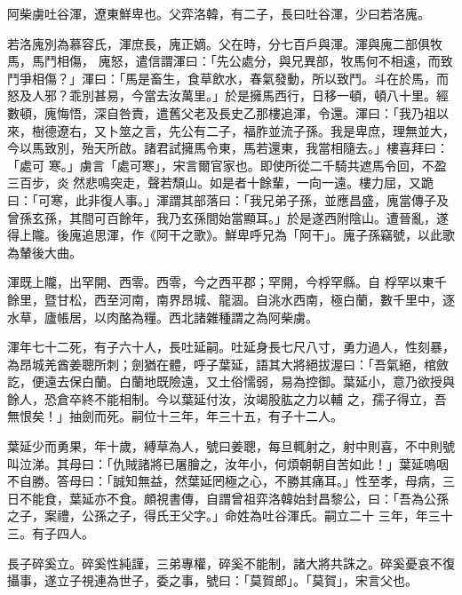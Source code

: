
\begin{pinyinscope}

 阿柴虜吐谷渾，遼東鮮卑也。父弈洛韓，有二子，長曰吐谷渾，少曰若洛廆。



 若洛廆別為慕容氏，渾庶長，廆正嫡。父在時，分七百戶與渾。渾與廆二部俱牧馬，馬鬥相傷，
 廆怒，遣信謂渾曰：「先公處分，與兄異部，牧馬何不相遠，而致鬥爭相傷？」渾曰：「馬是畜生，食草飲水，春氣發動，所以致鬥。斗在於馬，而怒及人邪？乖別甚易，今當去汝萬里。」於是擁馬西行，日移一頓，頓八十里。經數頓，廆悔悟，深自咎責，遣舊父老及長史乙那樓追渾，令還。渾曰：「我乃祖以來，樹德遼右，又卜筮之言，先公有二子，福胙並流子孫。我是卑庶，理無並大，今以馬致別，殆天所啟。諸君試擁馬令東，馬若還東，我當相隨去。」樓喜拜曰：「處可
 寒。」虜言「處可寒」，宋言爾官家也。即使所從二千騎共遮馬令回，不盈三百步，炎然悲鳴突走，聲若頹山。如是者十餘輩，一向一遠。樓力屈，又跪曰：「可寒，此非復人事。」渾謂其部落曰：「我兄弟子孫，並應昌盛，廆當傳子及曾孫玄孫，其間可百餘年，我乃玄孫間始當顯耳。」於是遂西附陰山。遭晉亂，遂得上隴。後廆追思渾，作《阿干之歌》。鮮卑呼兄為「阿干」。廆子孫竊號，以此歌為輦後大曲。



 渾既上隴，出罕開、西零。西零，今之西平郡；罕開，今桴罕縣。自
 桴罕以東千餘里，暨甘松，西至河南，南界昂城、龍涸。自洮水西南，極白蘭，數千里中，逐水草，廬帳居，以肉酪為糧。西北諸雜種謂之為阿柴虜。



 渾年七十二死，有子六十人，長吐延嗣。吐延身長七尺八寸，勇力過人，性刻暴，為昂城羌酋姜聰所刺；劍猶在體，呼子葉延，語其大將絕拔渥曰：「吾氣絕，棺斂訖，便遠去保白蘭。白蘭地既險遠，又土俗懦弱，易為控御。葉延小，意乃欲授與餘人，恐倉卒終不能相制。今以葉延付汝，汝竭股肱之力以輔
 之，孺子得立，吾無恨矣！」抽劍而死。嗣位十三年，年三十五，有子十二人。



 葉延少而勇果，年十歲，縛草為人，號曰姜聰，每旦輒射之，射中則喜，不中則號叫泣涕。其母曰：「仇賊諸將已屠膾之，汝年小，何煩朝朝自苦如此！」葉延嗚咽不自勝。答母曰：「誠知無益，然葉延罔極之心，不勝其痛耳。」性至孝，母病，三日不能食，葉延亦不食。頗視書傳，自謂曾祖弈洛韓始封昌黎公，曰：「吾為公孫之子，案禮，公孫之子，得氏王父字。」命姓為吐谷渾氏。嗣立二十
 三年，年三十三。有子四人。



 長子碎奚立。碎奚性純謹，三弟專權，碎奚不能制，諸大將共誅之。碎奚憂哀不復攝事，遂立子視連為世子，委之事，號曰：「莫賀郎」。「莫賀」，宋言父也。




\end{pinyinscope}
